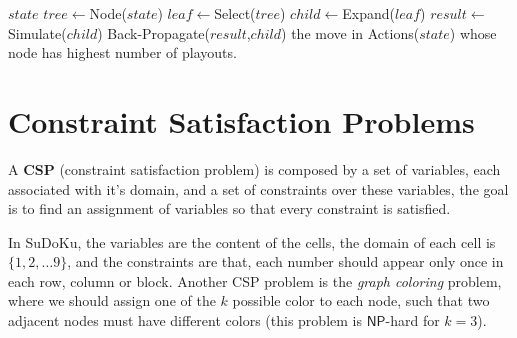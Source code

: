 \documentclass[10pt, letterpaper]{report}
\begin{document}
\begin{algorithm}
    \caption{Monte-Carlo-Tree-Search}\label{alg:MTCS}
    \begin{algorithmic}
    \Require $state$
    \State $tree\leftarrow$Node($state$)
    \State $leaf\leftarrow$Select($tree$)
    \State $child\leftarrow$Expand($leaf$)
    \State$result\leftarrow$Simulate($child$)
    \State Back-Propagate($result$,$child$)
    \EndWhile
    \State\Return the move in Actions($state$) whose node has highest number of playouts.
    \end{algorithmic}
\end{algorithm}














\chapter{Constraint Satisfaction Problems}
\begin{definition}
    A \textbf{CSP} (constraint satisfaction problem) is composed by a set of variables, each associated with it's domain, and a set of constraints over these variables, the goal is to find an assignment of variables so that every constraint is satisfied.
\end{definition}
In SuDoKu, the variables are the content of the cells, the domain of each cell is $\{1,2,\dots 9\}$, and the constraints are that, each number should appear only once in each row, column or block. Another CSP problem is the \textit{graph coloring} problem, where we should assign one of the $k$ possible color to each node, such that two adjacent nodes must have different colors (this problem is $\mathsf{NP}$-hard for $k=3$).
\end{document}
